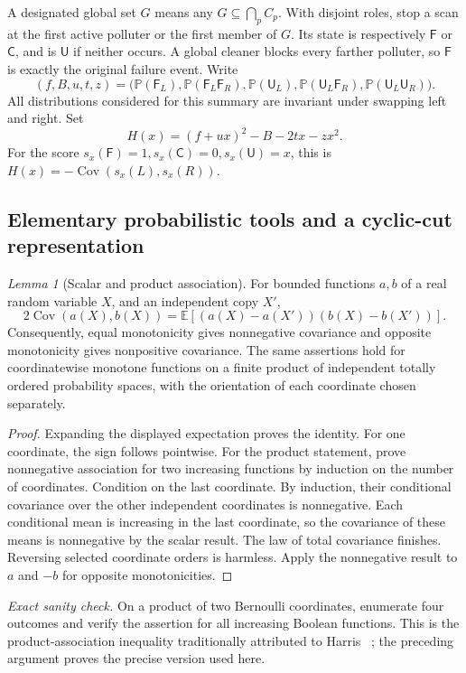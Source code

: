 \documentclass[11pt,a4paper]{article}
\theoremstyle{definition}\newtheorem{definition}[theorem]{Definition}
\theoremstyle{remark}\newtheorem{remark}[theorem]{Remark}
\newtheorem{xlemma}[xtheorem]{Lemma}
\theoremstyle{definition}\newtheorem{xexample}[xtheorem]{Example}\theoremstyle{plain}
\newcommand{\PP}{\mathbb P}\newcommand{\EE}{\mathbb E}\newcommand{\Cov}{\operatorname{Cov}}
\newcommand{\Fail}{\mathsf F}\newcommand{\Clean}{\mathsf C}\newcommand{\Und}{\mathsf U}
\newcommand{\xcheck}[1]{\par\smallskip\textit{Exact sanity check.} #1\par}
\begin{document}
A designated global set $G$ means any $G\subseteq\bigcap_p C_p$. With disjoint roles, stop a scan at the first active polluter or the first member of $G$. Its state is respectively $\Fail$ or $\Clean$, and is $\Und$ if neither occurs. A global cleaner blocks every farther polluter, so $\Fail$ is exactly the original failure event. Write
\begin{equation}\label{x:eq:summaries}
(f,B,u,t,z)=\bigl(\PP(\Fail_L),\PP(\Fail_L\Fail_R),
\PP(\Und_L),\PP(\Und_L\Fail_R),\PP(\Und_L\Und_R)\bigr).
\end{equation}
All distributions considered for this summary are invariant under swapping left and right. Set
\begin{equation}\label{x:eq:H}
H(x)=(f+ux)^2-B-2tx-zx^2.
\end{equation}
For the score $s_x(\Fail)=1,s_x(\Clean)=0,s_x(\Und)=x$, this is
$H(x)=-\Cov(s_x(L),s_x(R))$.

\subsection{Elementary probabilistic tools and a cyclic-cut representation}

\begin{xlemma}[Scalar and product association]\label{x:lem:association}
For bounded functions $a,b$ of a real random variable $X$, and an independent copy $X'$, 
\[
2\Cov(a(X),b(X))=
\EE[(a(X)-a(X'))(b(X)-b(X'))].
\]
Consequently, equal monotonicity gives nonnegative covariance and opposite monotonicity gives nonpositive covariance. The same assertions hold for coordinatewise monotone functions on a finite product of independent totally ordered probability spaces, with the orientation of each coordinate chosen separately.
\end{xlemma}
\begin{proof}
Expanding the displayed expectation proves the identity. For one coordinate, the sign follows pointwise. For the product statement, prove nonnegative association for two increasing functions by induction on the number of coordinates. Condition on the last coordinate. By induction, their conditional covariance over the other independent coordinates is nonnegative. Each conditional mean is increasing in the last coordinate, so the covariance of these means is nonnegative by the scalar result. The law of total covariance finishes. Reversing selected coordinate orders is harmless. Apply the nonnegative result to $a$ and $-b$ for opposite monotonicities.
\end{proof}
\xcheck{On a product of two Bernoulli coordinates, enumerate four outcomes and verify the assertion for all increasing Boolean functions. This is the product-association inequality traditionally attributed to Harris ~\cite{harris}; the preceding argument proves the precise version used here.}
\end{document}
